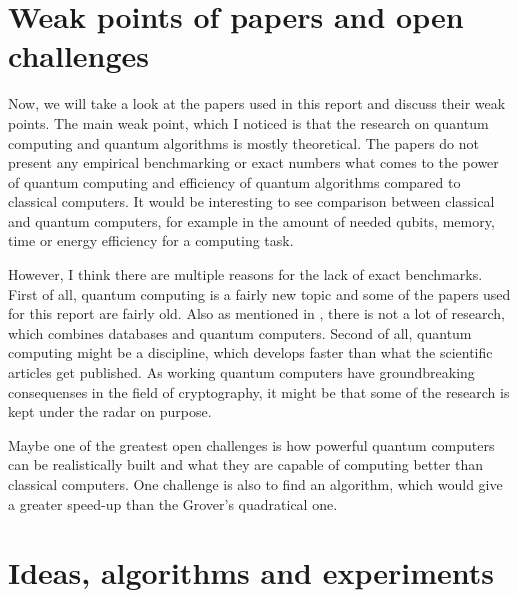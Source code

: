 \documentclass[english,oneside,openright]{UH_DS_report}
\begin{document}
\chapter{Weak points of papers and open challenges}
\label{chapter:weakpoints}

Now, we will take a look at the papers used in this report and discuss their weak points. The main weak point, which I noticed is that the research on quantum computing and quantum algorithms is mostly theoretical. The papers do not present any empirical benchmarking or exact numbers what comes to the power of quantum computing and efficiency of quantum algorithms compared to classical computers. It would be interesting to see comparison between classical and quantum computers, for example in the amount of needed qubits, memory, time or energy efficiency for a computing task.

However, I think there are multiple reasons for the lack of exact benchmarks. First of all, quantum computing is a fairly new topic and some of the papers used for this report are fairly old. Also as mentioned in \cite{qcdb}, there is not a lot of research, which combines databases and quantum computers. Second of all, quantum computing might be a discipline, which develops faster than what the scientific articles get published. As working quantum computers have groundbreaking consequenses in the field of cryptography, it might be that some of the research is kept under the radar on purpose.

Maybe one of the greatest open challenges is how powerful quantum computers can be realistically built and what they are capable of computing better than classical computers. One challenge is also to find an algorithm, which would give a greater speed-up than the Grover's quadratical one.

\chapter{Ideas, algorithms and experiments}
\label{chapter:ideas}
\end{document}
